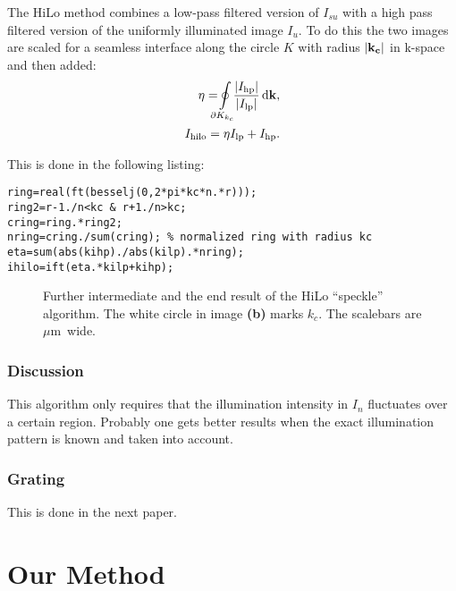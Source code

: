 \documentclass[11pt,abstracton,titlepage]{scrartcl}
\newcommand{\abs}[1]{\left| #1 \right|}
\renewcommand{\v }[1]{\bf #1}
\begin{document}
The HiLo method combines a low-pass filtered version of $I_{su}$ with
a high pass filtered version of the uniformly illuminated image $I_u$.
To do this the two images are scaled for a seamless interface along
the circle $K$ with radius $\abs{\v k_c}$ in k-space and then added:
\begin{align}
  \eta=\!\!\!\!\ointop_{\partial K_{k_c}}\!\!\!
  \frac{\abs{I_\textrm{hp}}}{\abs{I_\textrm{lp}}}\,\textrm{d}\v k,\\
  I_\textrm{hilo}=\eta I_\textrm{lp}+I_\textrm{hp}.
\end{align}

This is done in the following listing:
\begin{lstlisting}
ring=real(ft(besselj(0,2*pi*kc*n.*r)));
ring2=r-1./n<kc & r+1./n>kc;
cring=ring.*ring2;
nring=cring./sum(cring); % normalized ring with radius kc
eta=sum(abs(kihp)./abs(kilp).*nring);
ihilo=ift(eta.*kilp+kihp);
\end{lstlisting}

\begin{figure}[htb]
  \centering
  \caption{Further intermediate and the end result of the HiLo ``speckle'' algorithm. The white circle in image {\bf (b)} marks $k_c$. The scalebars are \unit[2]{$\mu$m} wide.}
  \label{fig:hilo1interm2}
\end{figure}

\subsubsection*{Discussion}
This algorithm only requires that the illumination intensity in $I_n$
fluctuates over a certain region. Probably one gets better results
when the exact illumination pattern is known and taken into account.

\subsubsection{Grating}
This is done in the next paper. 

\section{Our Method}





\end{document}
